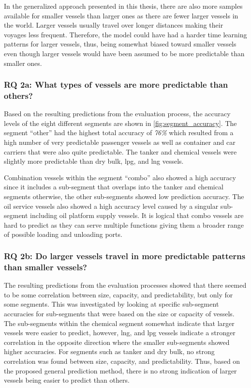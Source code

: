 In the generalized approach presented in this thesis, there are also more samples available for smaller vessels than larger ones as there are fewer larger vessels in the world. Larger vessels usually travel over longer distances making their voyages less frequent. Therefore, the model could have had a harder time learning patterns for larger vessels, thus, being somewhat biased toward smaller vessels even though larger vessels would have been assumed to be more predictable than smaller ones.

\subsubsection{RQ 2a: What types of vessels are more predictable than others?}

Based on the resulting predictions from the evaluation process, the accuracy levels of the eight different segments are shown in \cref{fig:segment_accuracy}. The segment ``other'' had the highest total accuracy of \textit{76\%} which resulted from a high number of very predictable passenger vessels as well as container and car carriers that were also quite predictable. The tanker and chemical vessels were slightly more predictable than dry bulk, \acrfull{lpg}, and \acrfull{lng} vessels.

Combination vessels within the segment ``combo'' also showed a high accuracy since it includes a sub-segment that overlaps into the tanker and chemical segments otherwise, the other sub-segments showed low prediction accuracy. The oil service vessels also showed a high accuracy level caused by a singular sub-segment including oil platform supply vessels. It is logical that combo vessels are hard to predict as they can serve multiple functions giving them a broader range of possible loading and unloading ports.

\subsubsection{RQ 2b: Do larger vessels travel in more predictable patterns than smaller vessels?}

The resulting predictions from the evaluation processes showed that there seemed to be some correlation between size, capacity, and predictability, but only for some segments. This was investigated by looking at specific sub-segment accuracies for sub-segments that were based on the size or capacity of vessels. The sub-segments within the chemical segment somewhat indicate that larger vessels were easier to predict, however, \acrshort{lng}, and \acrshort{lpg} vessels indicate a stronger correlation in the opposite direction where the smaller sub-segments showed higher accuracies. For segments such as tanker and dry bulk, no strong correlation was found between size, capacity, and predictability. Thus, based on the proposed general prediction method, there is no strong indication of larger vessels being easier to predict than others.

